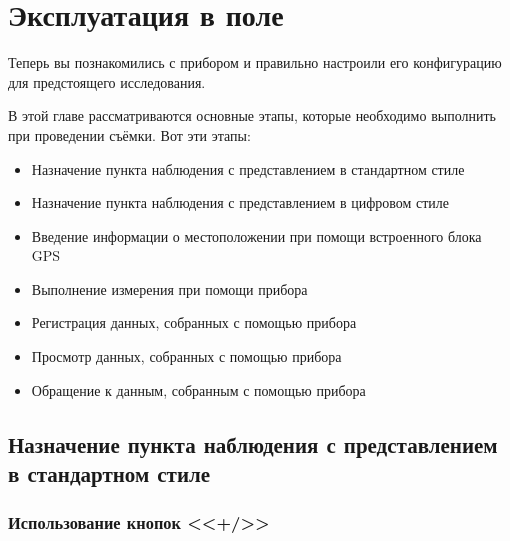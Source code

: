 \chapter[Эксплуатация]{Эксплуатация \cg{} в поле}
\label{chap:operating_the_cg6_autograv_in_the_field}

Теперь вы познакомились с прибором \cg{} и правильно настроили его конфигурацию
для предстоящего исследования.

В этой главе рассматриваются основные этапы, которые необходимо выполнить при
проведении съёмки. Вот эти этапы:
\begin{itemize}
  \item Назначение пункта наблюдения с представлением в стандартном стиле

  \item Назначение пункта наблюдения с представлением в цифровом стиле

  \item Введение информации о местоположении при помощи встроенного блока GPS

  \item Выполнение измерения при помощи прибора \cg{}

  \item Регистрация данных, собранных с помощью прибора \cg{}

  \item Просмотр данных, собранных с помощью прибора \cg{}

  \item Обращение к данным, собранным с помощью прибора \cg{}
\end{itemize}

\section[Назначение пункта]{Назначение пункта наблюдения с представлением в стандартном стиле}



\subsection{Использование кнопок <<+/\textminus{}>>}

